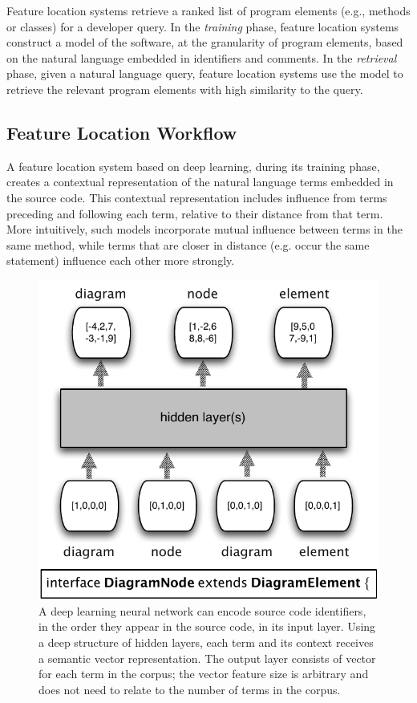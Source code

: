 
%
%

%
Feature location systems retrieve a ranked list of program elements (e.g.,
methods or classes) for a developer query. In the {\em training} phase, feature
location systems construct a model of the software, at the granularity
of program elements, based on the natural language embedded in identifiers and
comments. In the {\em retrieval} phase, given a natural language query, feature
location systems use the model to retrieve the relevant program elements
with high similarity to the query.

\subsection{Feature Location Workflow}

%
A feature location system based on deep learning, during its training phase,
creates a contextual representation of the natural language terms embedded in
the source code. This contextual representation includes influence from terms
preceding and following each term, relative to their distance from that term.
More intuitively, such models incorporate mutual influence between terms in the
same method, while terms that are closer in distance (e.g. occur the same
statement) influence each other more strongly.


\begin{figure}[tb]
\centering
\includegraphics[width=.9\columnwidth]{figures/neuralnet.pdf}
\caption{A deep learning neural network can encode source code identifiers, in the
order they appear in the source code, in its input layer. Using a deep
structure of hidden layers, each term and its context receives a semantic
vector representation. The output layer consists of vector for each term in
the corpus; the vector feature size is arbitrary and does not need to relate to
the number of terms in the corpus.
\vspace*{-2mm}
}
\label{fig:neuralnet}
\end{figure}


